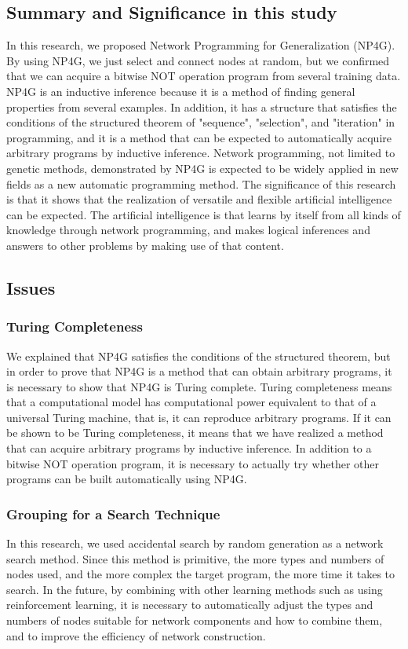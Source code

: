 \documentclass{article}
\begin{document}
\subsection {Summary and Significance in this study}
In this research, we proposed Network Programming for Generalization (NP4G).
By using NP4G, we just select and connect nodes at random, but we confirmed that we can acquire a bitwise NOT operation program from several training data.
NP4G is an inductive inference because it is a method of finding general properties from several examples.
In addition, it has a structure that satisfies the conditions of the structured theorem of "sequence", "selection", and "iteration" in programming, and it is a method that can be expected to automatically acquire arbitrary programs by inductive inference.
Network programming, not limited to genetic methods, demonstrated by NP4G is expected to be widely applied in new fields as a new automatic programming method.
The significance of this research is that it shows that the realization of versatile and flexible artificial intelligence can be expected. The artificial intelligence is that learns by itself from all kinds of knowledge through network programming, and makes logical inferences and answers to other problems by making use of that content.

\subsection {Issues}
\subsubsection {Turing Completeness}
We explained that NP4G satisfies the conditions of the structured theorem, but in order to prove that NP4G is a method that can obtain arbitrary programs, it is necessary to show that NP4G is Turing complete.
Turing completeness means that a computational model has computational power equivalent to that of a universal Turing machine, that is, it can reproduce arbitrary programs.
If it can be shown to be Turing completeness, it means that we have realized a method that can acquire arbitrary programs by inductive inference.
In addition to a bitwise NOT operation program, it is necessary to actually try whether other programs can be built automatically using NP4G.

\subsubsection {Grouping for a Search Technique}
In this research, we used accidental search by random generation as a network search method.
Since this method is primitive, the more types and numbers of nodes used, and the more complex the target program, the more time it takes to search.
In the future, by combining with other learning methods such as using reinforcement learning, it is necessary to automatically adjust the types and numbers of nodes suitable for network components and how to combine them, and to improve the efficiency of network construction.
\end{document}
